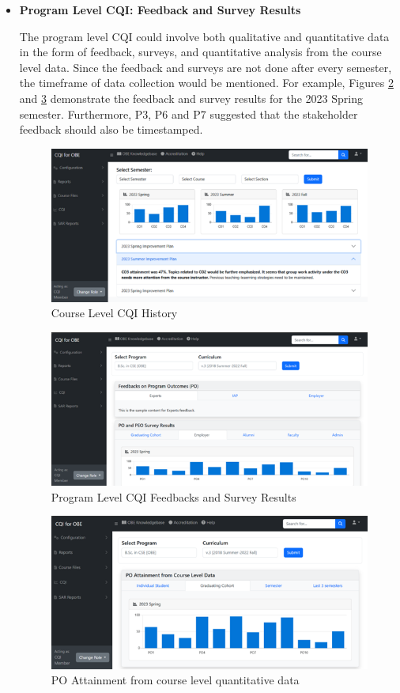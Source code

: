 \documentclass[journal,onecolumn]{IEEEtran}
\begin{document}
\begin{itemize}
 \item \textbf{Program Level CQI: Feedback and Survey Results}

The program level CQI could involve both qualitative and quantitative data in the form of feedback, surveys, and quantitative analysis from the course level data. Since the feedback and surveys are not done after every semester, the timeframe of data collection would be mentioned. For example, Figures \ref{fig:program-level-cqi-feedbacks-survey} and \ref{fig:po-attainment} demonstrate the feedback and survey results for the 2023 Spring semester. Furthermore, P3, P6 and P7 suggested that the stakeholder feedback should also be timestamped.
\begin{figure}
    \centering
    \includegraphics[width=0.8\linewidth]{img/Picture10.png}
    \caption{Course Level CQI History}
    \label{fig:course-level-cqi-history}
\end{figure}

\begin{figure}
    \centering
    \includegraphics[width=0.8\linewidth]{img/Picture11.png}
    \caption{Program Level CQI Feedbacks and Survey Results}
    \label{fig:program-level-cqi-feedbacks-survey}
\end{figure}
\begin{figure}
    \centering
    \includegraphics[width=0.8\linewidth]{img/Picture12.png}
    \caption{PO Attainment from course level quantitative data}
    \label{fig:po-attainment}
\end{figure}







\end{itemize}
\end{document}
